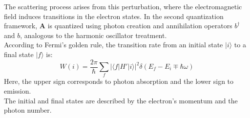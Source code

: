 The scattering process arises from this perturbation, where the electromagnetic field induces transitions in the electron states. In the second quantization framework, \( \mathbf{A} \) is quantized using photon creation and annihilation operators \( b^\dagger \) and \( b \), analogous to the harmonic oscillator treatment.\\
According to Fermi’s golden rule, the transition rate from an initial state \( |i\rangle \) to a final state \( |f\rangle \) is:
\begin{equation}
	W(i) = \frac{2\pi}{\hbar} \sum_f \left| \langle f | H' | i \rangle \right|^2 \delta \left( E_f - E_i \mp \hbar \omega \right)
\end{equation}
Here, the upper sign corresponds to photon absorption and the lower sign to emission.\\
The initial and final states are described by the electron's momentum and the photon number.

